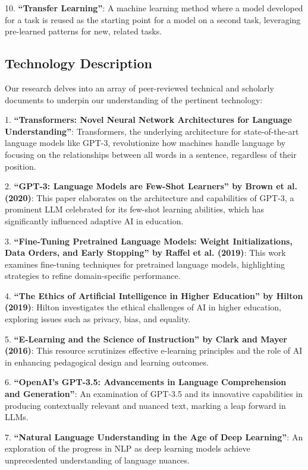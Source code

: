 \documentclass[]{article}
\begin{document}
10. \textbf{``Transfer Learning''}\cite{Guo}: A machine learning method where a model developed for a task is reused as the starting point for a model on a second task, leveraging pre-learned patterns for new, related tasks.

\subsection{Technology Description}

Our research delves into an array of peer-reviewed technical and scholarly documents to underpin our understanding of the pertinent technology:

1. \textbf{``Transformers: Novel Neural Network Architectures for Language Understanding''}\cite{Chen}: Transformers, the underlying architecture for state-of-the-art language models like GPT-3, revolutionize how machines handle language by focusing on the relationships between all words in a sentence, regardless of their position.

2. \textbf{``GPT-3: Language Models are Few-Shot Learners'' by Brown et al. (2020)}\cite{MeyerJ}: This paper elaborates on the architecture and capabilities of GPT-3, a prominent LLM celebrated for its few-shot learning abilities, which has significantly influenced adaptive AI in education.

3. \textbf{``Fine-Tuning Pretrained Language Models: Weight Initializations, Data Orders, and Early Stopping'' by Raffel et al. (2019)}\cite{raffel2019finetuning}: This work examines fine-tuning techniques for pretrained language models, highlighting strategies to refine domain-specific performance.

4. \textbf{``The Ethics of Artificial Intelligence in Higher Education'' by Hilton (2019)}\cite{hilton2019ethics}: Hilton investigates the ethical challenges of AI in higher education, exploring issues such as privacy, bias, and equality.

5. \textbf{``E-Learning and the Science of Instruction'' by Clark and Mayer (2016)}\cite{clarkmayer2016elearning}: This resource scrutinizes effective e-learning principles and the role of AI in enhancing pedagogical design and learning outcomes.

6. \textbf{``OpenAI's GPT-3.5: Advancements in Language Comprehension and Generation''}\cite{Ding}: An examination of GPT-3.5 and its innovative capabilities in producing contextually relevant and nuanced text, marking a leap forward in LLMs.

7. \textbf{``Natural Language Understanding in the Age of Deep Learning''}\cite{Mohamadi}: An exploration of the progress in NLP as deep learning models achieve unprecedented understanding of language nuances.
\end{document}

